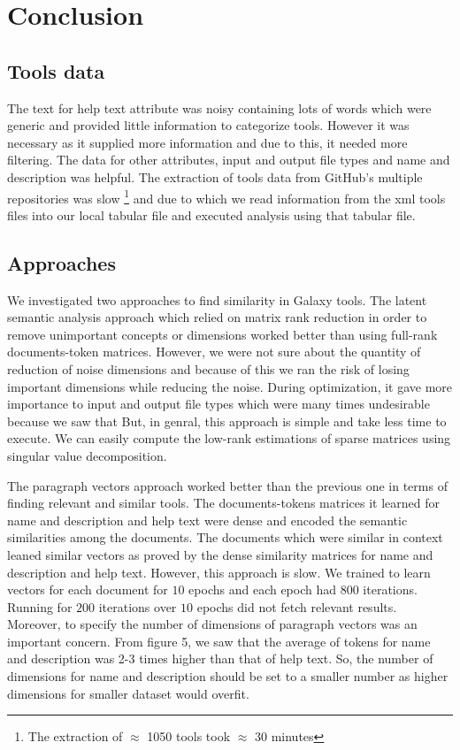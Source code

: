 \chapter{Conclusion}
\section{Tools data}
The text for help text attribute was noisy containing lots of words which were generic and provided little information to categorize tools. However it was necessary as it supplied more information and due to this, it needed more filtering. The data for other attributes, input and output file types and name and description was helpful. The extraction of tools data from GitHub's multiple repositories was slow \footnote{The extraction of $\approx$ 1050 tools  took $\approx$ 30 minutes} and due to which we read information from the xml tools files into our local tabular file and executed analysis using that tabular file.

\section{Approaches}
We investigated two approaches to find similarity in Galaxy tools. The latent semantic analysis approach which relied on matrix rank reduction in order to remove unimportant concepts or dimensions worked better than using full-rank documents-token matrices. However, we were not sure about the quantity of reduction of noise dimensions and because of this we ran the risk of losing important dimensions while reducing the noise. During optimization, it gave more importance to input and output file types which were many times undesirable because we saw that 
But, in genral, this approach is simple and take less time to execute. We can easily compute the low-rank estimations of sparse matrices using singular value decomposition. 

The paragraph vectors approach worked better than the previous one in terms of finding relevant and similar tools. The documents-tokens matrices it learned for name and description and help text were dense and encoded the semantic similarities among the documents. The documents which were similar in context leaned similar vectors as proved by the dense similarity matrices for name and description and help text. However, this approach is slow. We trained to learn vectors for each document for $10$ epochs and each epoch had $800$ iterations. Running for $200$ iterations over $10$ epochs did not fetch relevant results. Moreover, to specify the number of dimensions of paragraph vectors was an important concern. From figure 5, we saw that the average of tokens for name and description was 2-3 times higher than that of help text. So, the number of dimensions for name and description should be set to a smaller number as higher dimensions for smaller dataset would overfit.

